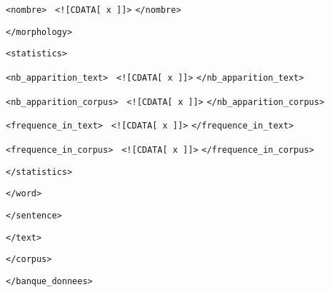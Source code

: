 {\begin{minipage}{.85\textwidth}
{\texttt{\hspace{2.8cm}<nombre> } 
\texttt{\hspace{0cm}<![CDATA[ x ]]>}
\texttt{\hspace{0cm}</nombre> } 

\texttt{\hspace{2.5cm}</morphology> } 

\texttt{\hspace{2.5cm}<statistics> } 

\texttt{\hspace{2.8cm}<nb\_apparition\_text> } 
\texttt{\hspace{0cm}<![CDATA[ x ]]>}
\texttt{\hspace{0cm}</nb\_apparition\_text> } 

\texttt{\hspace{2.8cm}<nb\_apparition\_corpus> } 
\texttt{\hspace{0cm}<![CDATA[ x ]]>}
\texttt{\hspace{0cm}</nb\_apparition\_corpus> } 

\texttt{\hspace{2.8cm}<frequence\_in\_text> } 
\texttt{\hspace{0cm}<![CDATA[ x ]]>}
\texttt{\hspace{0cm}</frequence\_in\_text> } 

\texttt{\hspace{2.8cm}<frequence\_in\_corpus> } 
\texttt{\hspace{0cm}<![CDATA[ x ]]>}
\texttt{\hspace{0cm}</frequence\_in\_corpus> } 

\texttt{\hspace{2.5cm}</statistics> } 

\texttt{\hspace{2cm}</word> } 

\texttt{\hspace{1.5cm}</sentence> } 

\texttt{\hspace{1cm}</text> } 

\texttt{\hspace{.5cm}</corpus> } 

\texttt{</banque\_donnees> } 

}
\end{minipage}
}

~~\\

